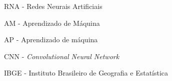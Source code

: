 \begin{siglas}
	\item RNA - Redes Neurais Artificiais
	\item AM - Aprendizado de Máquina
	\item AP - Aprendizado de máquina
	\item CNN - \textit{Convolutional Neural Network}
	\item IBGE - Instituto Brasileiro de Geografia e Estatística
\end{siglas}
